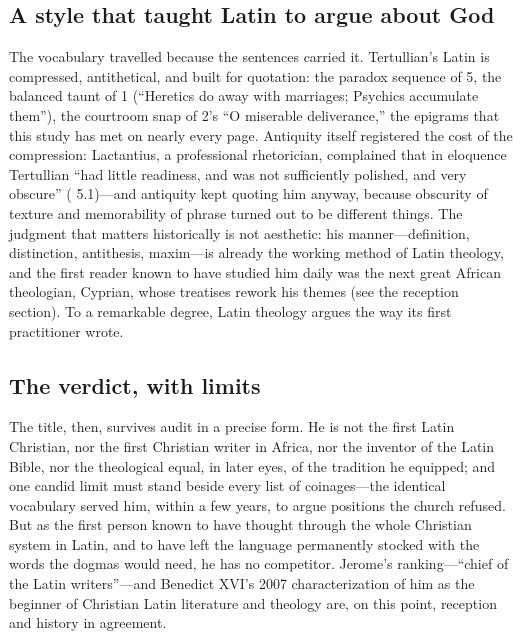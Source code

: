 \subsection{A style that taught Latin to argue about God}

The vocabulary travelled because the sentences carried it. Tertullian's
Latin is compressed, antithetical, and built for quotation: the paradox
sequence of  5, the balanced taunt of  1 (``Heretics do away with marriages; Psychics accumulate them''),
the courtroom snap of  2's ``O miserable deliverance,'' the
epigrams that this study has met on nearly every page. Antiquity itself
registered the cost of the compression: Lactantius, a professional
rhetorician, complained that in eloquence Tertullian ``had little readiness,
and was not sufficiently polished, and very obscure'' ( 5.1)---and antiquity kept quoting him anyway, because obscurity
of texture and memorability of phrase turned out to be different things.
The judgment that matters historically is not aesthetic: his
manner---definition, distinction, antithesis, maxim---is already the working
method of Latin theology, and the first reader known to have studied him
daily was the next great African theologian, Cyprian, whose treatises rework
his themes (see the reception section). To a remarkable degree, Latin
theology argues the way its first practitioner wrote.

\subsection{The verdict, with limits}

The title, then, survives audit in a precise form. He is not the first Latin
Christian, nor the first Christian writer in Africa, nor the inventor of the
Latin Bible, nor the theological equal, in later eyes, of the tradition he
equipped; and one candid limit must stand beside every list of coinages---the
identical vocabulary served him, within a few years, to argue positions the
church refused. But as the first person known to have thought through the
whole Christian system in Latin, and to have left the language permanently
stocked with the words the dogmas would need, he has no competitor. Jerome's
ranking---``chief of the Latin writers''---and Benedict XVI's 2007
characterization of him as the beginner of Christian Latin literature and
theology are, on this point, reception and history in agreement.
